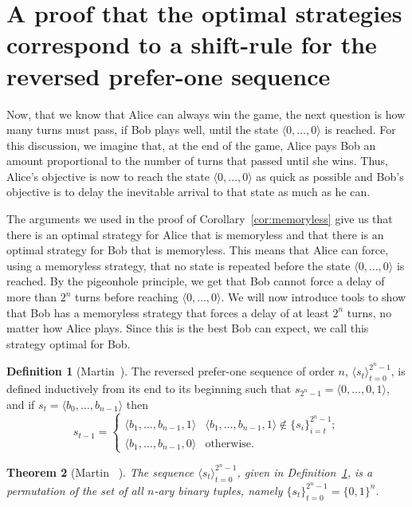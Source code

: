 \documentclass[final,12pt]{elsarticle}
\newtheorem{theorem}{Theorem} \newtheorem{proposition}[theorem]{Proposition} \newtheorem{claim}[theorem]{Claim}
\theoremstyle{definition} \newtheorem{definition}[theorem]{Definition} \newtheorem{observation}[theorem]{Observation} \newtheorem{example}[theorem]{Example} \newtheorem{remark}[theorem]{Remark} \newtheorem{corrolary}[theorem]{Corrolary}
\newcommand{\REF}[2]{#1~\ref{#2}}
\newcommand{\T}[1]{\langle{#1}\rangle}
\begin{document}
\section{A proof that the optimal strategies correspond to a shift-rule for the reversed prefer-one sequence}
\label{sec:optimal-strategies}

Now, that we know that Alice can always win the game, the next question is how many turns must pass, if Bob plays well, until the state $ \T{0,\dots,0}$ is reached. For this discussion, we imagine that, at the end of the game, Alice pays Bob an amount proportional to the number of turns that passed until she wins. Thus, Alice's objective is now to reach the state $\T{0,\dots,0}$ as quick as possible and Bob's objective is to delay the inevitable arrival to that state as much as he can. 

The arguments we used in the proof of Corollary~\ref{cor:memoryless} give us that there is an optimal strategy for Alice that is memoryless and that there is an optimal strategy for Bob that is memoryless. This means that Alice can force, using a memoryless strategy, that no state is repeated before the state $\T{0,\dots,0}$ is reached. By the pigeonhole principle, we get that Bob cannot force a delay of more than $2^n$ turns before reaching $ \T{0,\dots,0}$. We will now introduce tools to show that Bob has a memoryless strategy that forces a delay of at least $2^n$ turns, no matter how Alice plays. Since this is the best Bob can expect, we call this strategy optimal for Bob. 

\begin{definition}[Martin~\cite{Mar34}]

	\label{Def:pref1} The reversed prefer-one sequence of order $n$, $\langle s_t
		\rangle_{t=0}^{2^n-1}$, is defined inductively from its end to its beginning such that $s_{2^n-1}=
		\T{0,\dots,0,1}$, and if $s_t=\T{b_0,\dots,b_{n-1}}$ then $$ s_{t-1} =
		\begin{cases}
			\T{b_1,\dots,b_{n-1},1} &
			\T{b_1,\dots,b_{n-1},1} \notin \{s_i\}_{i=t}^{2^n-1}; \\
			\T{b_1,\dots,b_{n-1},0} &
			\text{otherwise}.
		\end{cases}
	$$
\end{definition}

\begin{theorem}[Martin~
		\cite{Mar34}]

	\label{Thm:pref1-is-debruijn} The sequence $
		\T{s_t}_{t=0}^{2^n-1}$, given in
	\REF{Definition}{Def:pref1}, is a permutation of the set of all $n$-ary binary tuples, namely $\{s_t\}_{t=0}^{2^n-1}=\{0,1\}^n$.
\end{theorem}
\end{document}
